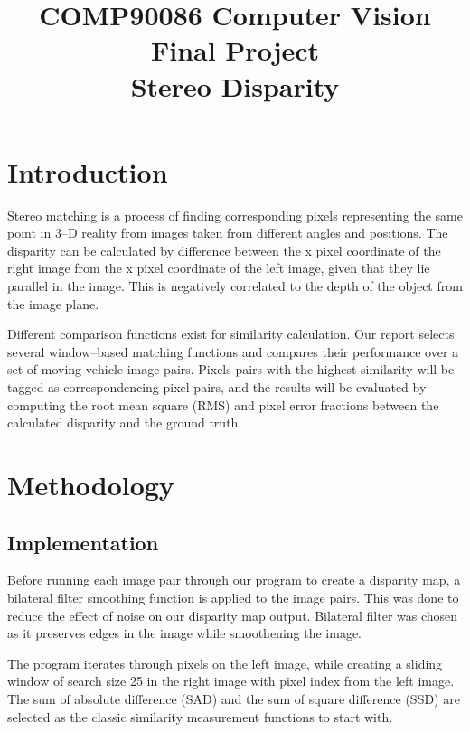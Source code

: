 \documentclass[conference]{IEEEtran}
\begin{document}
\title{COMP90086 Computer Vision Final Project\\
Stereo Disparity
}
\author{
\and
{}
}
\maketitle

\thispagestyle{plain}
\pagestyle{plain}

\section{Introduction}
Stereo matching is a process of finding corresponding pixels representing the same point in 3--D reality from images taken from different angles and positions. The disparity can be calculated by difference between the x pixel coordinate of the right image from the x pixel coordinate of the left image, given that they lie parallel in the image. This is negatively correlated to the depth of the object from the image plane.

Different comparison functions exist for similarity calculation. Our report selects several window--based matching functions and compares their performance over a set of moving vehicle image pairs. Pixels pairs with the highest similarity will be tagged as correspondencing pixel pairs, and the results will be evaluated by computing the root mean square (RMS) and pixel error fractions between the calculated disparity and the ground truth.

\section{Methodology}
\subsection{Implementation}
Before running each image pair through our program to create a disparity map, a bilateral filter smoothing function is applied to the image pairs. This was done to reduce the effect of noise on our disparity map output. Bilateral filter was chosen as it preserves edges in the image while smoothening the image.

The program iterates through pixels on the left image, while creating a sliding window of search size 25 in the right image with pixel index from the left image. The sum of absolute difference (SAD) and the sum of square difference (SSD) are selected as the classic similarity measurement functions to start with.
\end{document}
